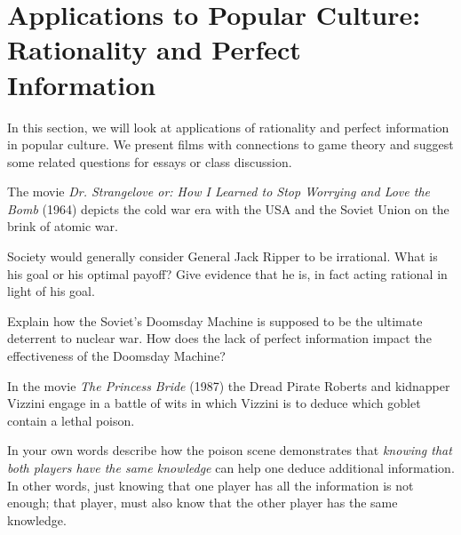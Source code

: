 
\section{Applications to Popular Culture: Rationality and Perfect Information}



\vspace{.1in}
In this section, we will look at applications of rationality and perfect information in popular culture. We present films with connections to game theory and suggest some related questions for essays or class discussion.


The movie \textit{Dr. Strangelove or: How I Learned to Stop Worrying and Love the Bomb} (1964) depicts the cold war era with the USA and the Soviet Union on the brink of atomic war. 

\begin{writing}
Society would generally consider General Jack Ripper to be irrational. What is his goal or his optimal payoff? Give evidence that he is, in fact acting rational in light of his goal. 
\end{writing}

\begin{writing}Explain how the Soviet's Doomsday Machine is supposed to be the ultimate deterrent to nuclear war. How does the lack of perfect information impact the effectiveness of the Doomsday Machine?
\end{writing}

In the movie \textit{The Princess Bride} (1987) the Dread Pirate Roberts and kidnapper Vizzini engage in a battle of wits in which Vizzini is to deduce which goblet contain a lethal poison.


\begin{writing}
In your own words describe how the poison scene demonstrates that \emph{knowing that both players have the same knowledge} can help  one deduce additional information. In other words, just knowing that one player has all the information is not enough; that player, must also know that the other player has the same knowledge.
\end{writing}

